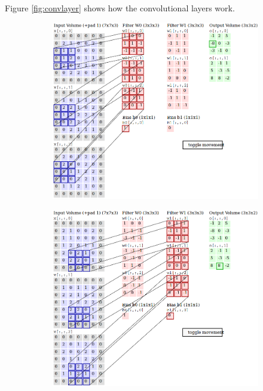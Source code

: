 \begin{description}
	Figure \ref{fig:convlayer} shows how the convolutional layers work. 
	
	\begin{figure}
		\centering
		\begin{subfigure}{0.65\textwidth}
			\centering
			\includegraphics[width=1\linewidth]{figures/convlayer_anime1big.png}
			\caption{}\label{fig:conv_a}
		\end{subfigure}
		\begin{subfigure}{0.65\textwidth}
			\centering
			\includegraphics[width=1\linewidth]{figures/convlayer_anime2big.png}

\end{subfigure}
\end{figure}
\end{description}
